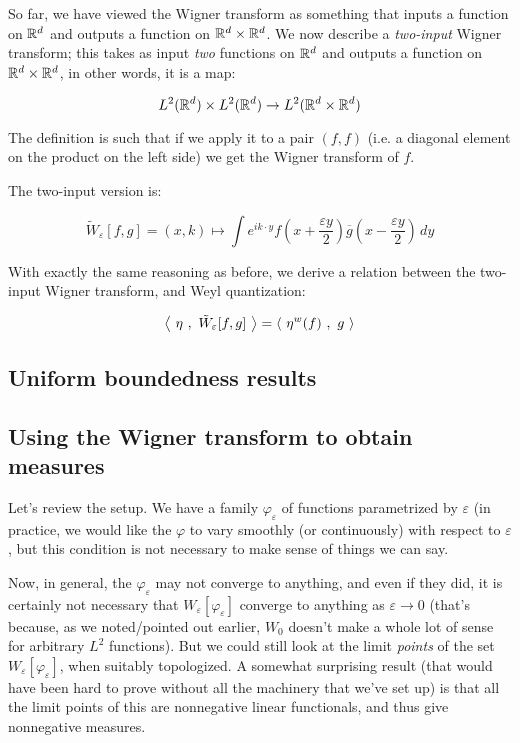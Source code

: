 \documentclass[a4paper]{amsart}
\begin{document}
So far, we have viewed the Wigner transform as something that inputs a
function on $\mathbb{R}^d$ and outputs a function on $\mathbb{R}^d \times \mathbb{R}^d$. We
now describe a {\em two-input} Wigner transform; this takes as input {\em two} functions
on $\mathbb{R}^d$ and outputs a function on $\mathbb{R}^d \times \mathbb{R}^d$, in other words, it is a map:

$$L^2(\mathbb{R}^d) \times L^2(\mathbb{R}^d) \to L^2(\mathbb{R}^d \times \mathbb{R}^d)$$

The definition is such that if we apply it to a pair $(f,f)$ (i.e. a
diagonal element on the product on the left side) we get the Wigner transform of $f$.

The two-input version is:

$$\tilde{W}_\varepsilon[f,g] = (x,k) \mapsto \int e^{ik\cdot y} f\left(x + \frac{\varepsilon y}{2}\right)\overline{g}\left(x - \frac{\varepsilon y}{2}\right) \, dy$$

With exactly the same reasoning as before, we derive a relation
between the two-input Wigner transform, and Weyl quantization:

$$\left< \ \eta \ , \ \tilde{W}_\varepsilon[f,g] \ \right> = \left< \ \eta^w(f) \ , \ g \ \right>$$

\subsection{Uniform boundedness results}


\subsection{Using the Wigner transform to obtain measures}

Let's review the setup. We have a family $\varphi_\varepsilon$ of
functions parametrized by $\varepsilon$ (in practice, we would like
the $\varphi$ to vary smoothly (or continuously) with respect to
$\varepsilon$, but this condition is not necessary to make sense of things we can say.

Now, in general, the $\varphi_\varepsilon$ may not converge to
anything, and even if they did, it is certainly not necessary that
$W_\varepsilon[\varphi_\varepsilon]$ converge to anything as
$\varepsilon \to 0$ (that's because, as we noted/pointed out earlier,
$W_0$ doesn't make a whole lot of sense for arbitrary $L^2$
functions). But we could still look at the limit {\em points} of the
set $W_\varepsilon[\varphi_\varepsilon]$, when suitably topologized. A
somewhat surprising result (that would have been hard to prove without
all the machinery that we've set up) is that all the limit points of
this are nonnegative linear functionals, and thus give nonnegative
measures.
\end{document}
